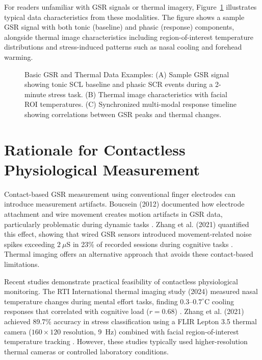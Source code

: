 \documentclass{report}
\begin{document}
    For readers unfamiliar with GSR signals or thermal imagery, Figure~\ref{fig:gsr-thermal-examples} illustrates typical data characteristics from these modalities. The figure shows a sample GSR signal with both tonic (baseline) and phasic (response) components, alongside thermal image characteristics including region-of-interest temperature distributions and stress-induced patterns such as nasal cooling and forehead warming.

    \begin{figure}[htbp]
        \centering
        \caption{Basic GSR and Thermal Data Examples: (A) Sample GSR signal showing tonic SCL baseline and phasic SCR events during a 2-minute stress task. (B) Thermal image characteristics with facial ROI temperatures. (C) Synchronized multi-modal response timeline showing correlations between GSR peaks and thermal changes.}
        \label{fig:gsr-thermal-examples}
    \end{figure}


    \section{Rationale for Contactless Physiological Measurement}
    \label{sec:rationale_contactless}

    Contact-based GSR measurement using conventional finger electrodes can introduce measurement artifacts. Boucsein (2012) documented how electrode attachment and wire movement creates motion artifacts in GSR data, particularly problematic during dynamic tasks \cite{boucsein2012}. Zhang et al. (2021) quantified this effect, showing that wired GSR sensors introduced movement-related noise spikes exceeding $2~\mu$S in 23\% of recorded sessions during cognitive tasks \cite{zhang2021}. Thermal imaging offers an alternative approach that avoids these contact-based limitations.

    Recent studies demonstrate practical feasibility of contactless physiological monitoring. The RTI International thermal imaging study (2024) measured nasal temperature changes during mental effort tasks, finding $0.3$--$0.7^{\circ}$C cooling responses that correlated with cognitive load ($r = 0.68$) \cite{rti2024}. Zhang et al. (2021) achieved 89.7\% accuracy in stress classification using a FLIR Lepton 3.5 thermal camera ($160 \times 120$ resolution, 9~Hz) combined with facial region-of-interest temperature tracking \cite{zhang2021}. However, these studies typically used higher-resolution thermal cameras or controlled laboratory conditions.
\end{document}

